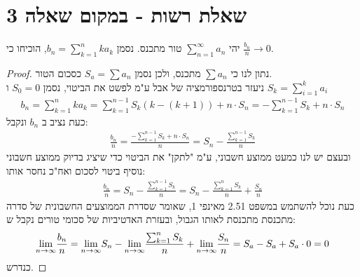 \documentclass{article}
\begin{document}
		\pagebreak
		\section*{שאלת רשות - במקום שאלה 3}
		יהי $\sum_{n=1}^\infty a_n$ טור מתכנס. נסמן $b_n = \sum_{k=1}^n ka_k$, הוכיחו כי $\frac{b_n}{n} \to 0$.
		\begin{proof}
			נתון לנו כי $\sum a_n$ מתכנס, ולכן נסמן $S_a = \sum a_n$ כסכום הטור. \\
			ניעזר בטרנספורמציה של אבל ע"מ לפשט את הביטוי, נסמן $S_0 = 0$ ו $S_k = \sum_{i=1}^k a_i$
			\begin{align*}
				b_n
				= \sum_{k=1}^n ka_k
				= \sum_{k=1}^{n-1} S_k(k - (k+1)) + n \cdot S_n
				= -\sum_{k=1}^{n-1} S_k + n \cdot S_n
			\end{align*}
			כעת נציב ב $b_n$ ונקבל:
			\begin{align*}
				\frac{b_n}{n}
				= \frac{-\sum_{k=1}^{n-1} S_k + n \cdot S_n}{n}
				= S_n - \frac{\sum_{k=1}^{n-1} S_k}{n}
			\end{align*}
			ובעצם יש לנו כמעט ממוצע חשבוני, ע"מ "לתקן" את הביטוי כדי שיציג בדיוק ממוצע חשבוני נוסיף ביטוי לסכום ואח"כ נחסר אותו:
			\begin{align*}
				\frac{b_n}{n}
				= S_n - \frac{\sum_{k=1}^{n-1} S_k}{n}
				= S_n - \frac{\sum_{k=1}^{n} S_k}{n} + \frac{S_n}{n}
			\end{align*}
			כעת נוכל להשתמש במשפט 2.51 מאינפי 1, שאומר שסדרת הממוצעים החשבונית של סדרה מתכנסת מתכנסת לאותו הגבול,
			ובעזרת האדטיביות של סכומי טורים נקבל ש:
			\begin{align*}
				\displaystyle{\lim_{n \to \infty}} \frac{b_n}{n}
				= \displaystyle{\lim_{n \to \infty}} S_n -  \displaystyle{\lim_{n \to \infty}}\frac{\sum_{k=1}^{n} S_k}{n} + \displaystyle{\lim_{n \to \infty}} \frac{S_n}{n}
				= S_a -  S_a + S_a \cdot 0
				= 0
			\end{align*}
			כנדרש.
		\end{proof}
\end{document}
